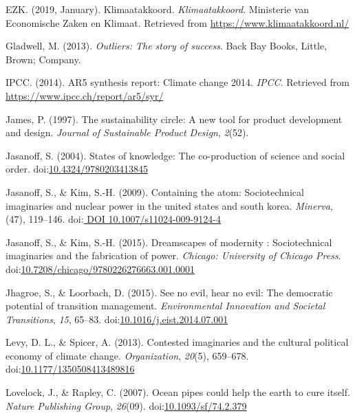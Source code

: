 \documentclass[man,floatsintext]{apa6}
\begin{document}
\hypertarget{ref-klimaat_2019}{}
EZK. (2019, January). Klimaatakkoord. \emph{Klimaatakkoord}. Ministerie
van Economische Zaken en Klimaat. Retrieved from
\url{https://www.klimaatakkoord.nl/}

\hypertarget{ref-gladwell_2013}{}
Gladwell, M. (2013). \emph{Outliers: The story of success}. Back Bay
Books, Little, Brown; Company.

\hypertarget{ref-ipcc_2014}{}
IPCC. (2014). AR5 synthesis report: Climate change 2014. \emph{IPCC}.
Retrieved from \url{https://www.ipcc.ch/report/ar5/syr/}

\hypertarget{ref-James_1997}{}
James, P. (1997). The sustainability circle: A new tool for product
development and design. \emph{Journal of Sustainable Product Design},
\emph{2}(52).

\hypertarget{ref-jasanoff_2004}{}
Jasanoff, S. (2004). States of knowledge: The co-production of science
and social order.
doi:\href{https://doi.org/10.4324/9780203413845}{10.4324/9780203413845}

\hypertarget{ref-Jasanoff_kim_2009}{}
Jasanoff, S., \& Kim, S.-H. (2009). Containing the atom: Sociotechnical
imaginaries and nuclear power in the united states and south korea.
\emph{Minerva}, (47), 119--146.
doi:\href{https://doi.org/\%20DOI\%2010.1007/s11024-009-9124-4}{ DOI 10.1007/s11024-009-9124-4}

\hypertarget{ref-jasanoff_kim_2015}{}
Jasanoff, S., \& Kim, S.-H. (2015). Dreamscapes of modernity :
Sociotechnical imaginaries and the fabrication of power. \emph{Chicago:
University of Chicago Press}.
doi:\href{https://doi.org/10.7208/chicago/9780226276663.001.0001}{10.7208/chicago/9780226276663.001.0001}

\hypertarget{ref-jhagroe_2015}{}
Jhagroe, S., \& Loorbach, D. (2015). See no evil, hear no evil: The
democratic potential of transition management. \emph{Environmental
Innovation and Societal Transitions}, \emph{15}, 65--83.
doi:\href{https://doi.org/10.1016/j.eist.2014.07.001}{10.1016/j.eist.2014.07.001}

\hypertarget{ref-levy_spicer_2013}{}
Levy, D. L., \& Spicer, A. (2013). Contested imaginaries and the
cultural political economy of climate change. \emph{Organization},
\emph{20}(5), 659--678.
doi:\href{https://doi.org/10.1177/1350508413489816}{10.1177/1350508413489816}

\hypertarget{ref-Buisding}{}
Lovelock, J., \& Rapley, C. (2007). Ocean pipes could help the earth to
cure itself. \emph{Nature Publishing Group}, \emph{26}(09).
doi:\href{https://doi.org/10.1093/sf/74.2.379}{10.1093/sf/74.2.379}
\end{document}
